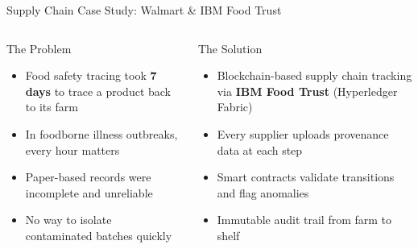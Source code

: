 \documentclass[8pt,aspectratio=169]{beamer}
\begin{document}
\begin{frame}{Supply Chain Case Study: Walmart \& IBM Food Trust}
\begin{columns}[T]
\begin{alertblock}{The Problem}
\footnotesize
\begin{itemize}
  \item Food safety tracing took \textbf{7 days} to trace a product back to its farm
  \item In foodborne illness outbreaks, every hour matters
  \item Paper-based records were incomplete and unreliable
  \item No way to isolate contaminated batches quickly
\end{itemize}
\end{alertblock}
\vspace{2mm}
\begin{exampleblock}{The Solution}
\footnotesize
\begin{itemize}
  \item Blockchain-based supply chain tracking via \textbf{IBM Food Trust} (Hyperledger Fabric)
  \item Every supplier uploads provenance data at each step
  \item Smart contracts validate transitions and flag anomalies
  \item Immutable audit trail from farm to shelf
\end{itemize}
\end{exampleblock}


\end{columns}
\end{frame}
\end{document}
